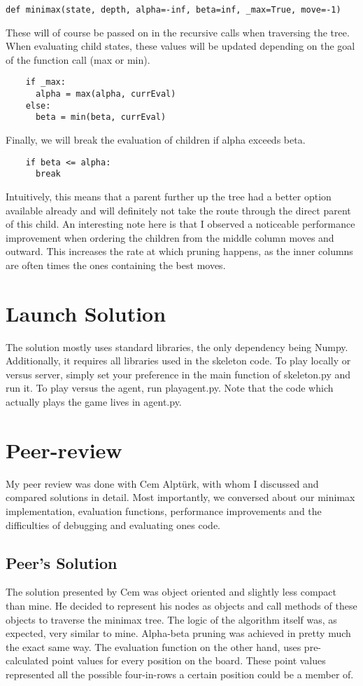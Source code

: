 \documentclass[a4paper]{article}
\begin{document}
\begin{verbatim}
def minimax(state, depth, alpha=-inf, beta=inf, _max=True, move=-1)
\end{verbatim}

These will of course be passed on in the recursive calls when traversing the tree. When evaluating child states, these values will be updated depending on the goal of the function call (max or min).

\begin{verbatim}
    if _max:
      alpha = max(alpha, currEval)
    else:
      beta = min(beta, currEval)
\end{verbatim}

Finally, we will break the evaluation of children if alpha exceeds beta.

\begin{verbatim}
    if beta <= alpha:
      break
\end{verbatim}

Intuitively, this means that a parent further up the tree had a better option available already and will definitely not take the route through the direct parent of this child.  An interesting note here is that I observed a noticeable performance improvement when ordering the children from the middle column moves and outward. This increases the rate at which pruning happens, as the inner columns are often times the ones containing the best moves.

\section{Launch Solution}
The solution mostly uses standard libraries, the only dependency being Numpy. Additionally, it requires all libraries used in the skeleton code. To play locally or versus server, simply set your preference in the main function of skeleton.py and run it. To play versus the agent, run playagent.py. Note that the code which actually plays the game lives in agent.py.

\section{Peer-review}
My peer review was done with Cem Alptürk, with whom I discussed and compared solutions in detail. Most importantly, we conversed about our minimax implementation, evaluation functions, performance improvements and the difficulties of debugging and evaluating ones code.


\subsection{Peer's Solution}
The solution presented by Cem was object oriented and slightly less compact than mine. He decided to represent his nodes as objects and call methods of these objects to traverse the minimax tree. The logic of the algorithm itself was, as expected, very similar to mine. Alpha-beta pruning was achieved in pretty much the exact same way. The evaluation function on the other hand, uses pre-calculated point values for every position on the board. These point values represented all the possible four-in-rows a certain position could be a member of.
\end{document}
